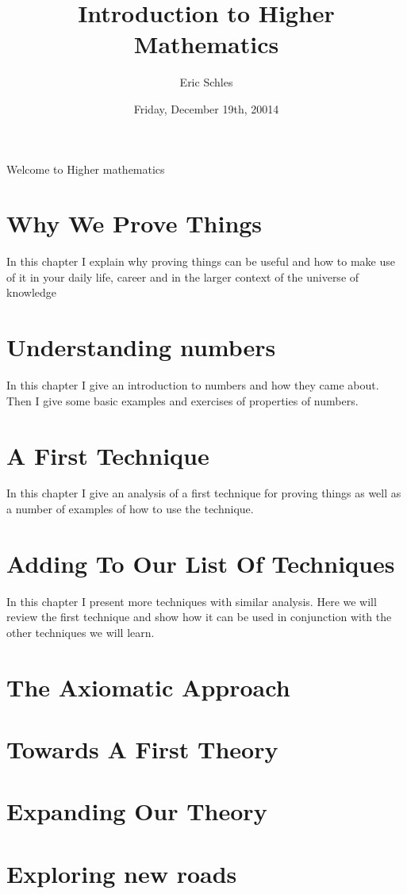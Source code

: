 \documentclass{book}
\title{Introduction to Higher Mathematics}
\author{Eric Schles}
\date{ Friday, December 19th, 20014}
\begin{document}
\maketitle
Welcome to Higher mathematics
\tableofcontents
\chapter{Why We Prove Things}
In this chapter I explain why proving things can be useful and how to make use of it in your daily life, career and in the larger context of the universe of knowledge
\chapter{Understanding numbers}
In this chapter I give an introduction to numbers and how they came about.  Then I give some basic examples and exercises of properties of numbers.  
\chapter{A First Technique}
In this chapter I give an analysis of a first technique for proving things as well as a number of examples of how to use the technique.
\chapter{Adding To Our List Of Techniques}
In this chapter I present more techniques with similar analysis.  Here we will review the first technique and show how it can be used in conjunction with the other techniques we will learn.
\chapter{The Axiomatic Approach}

\chapter{Towards A First Theory}
\chapter{Expanding Our Theory}
\chapter{Exploring new roads}
\end{document}
